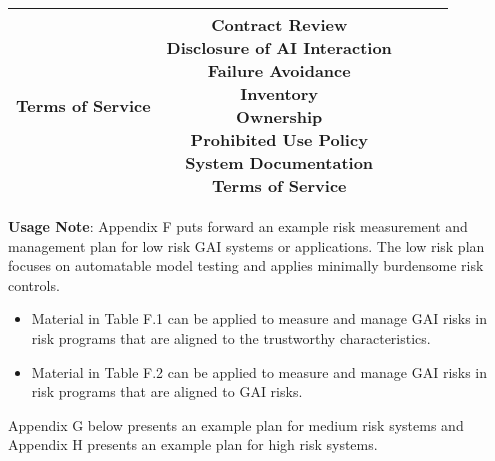 \documentclass[fleqn]{article}
\begin{document}
\begin{landscape}
\begin{table}[H]
\begin{tabular}{|c|c|c|c|c|}
{			\textbullet\hspace{3pt} Terms of Service\\ 	
		} 
		& \makecell[l]{ 	
			\textbullet\hspace{3pt} Contract Review\\ 	
			\textbullet\hspace{3pt} Disclosure of AI Interaction\\ 	
			\textbullet\hspace{3pt} Failure Avoidance\\ 	
			\textbullet\hspace{3pt} Inventory\\ 	
			\textbullet\hspace{3pt} Ownership\\ 	
			\textbullet\hspace{3pt} Prohibited Use Policy\\ 	
			\textbullet\hspace{3pt} System Documentation\\ 	
			\textbullet\hspace{3pt} Terms of Service	\\ 	
		}\\
		\hline
	\end{tabular}
	\label{table:low_risk_plan_by_gai_risk_cont3}
\end{table}

\noindent\textbf{Usage Note}: Appendix F puts forward an example risk measurement and management plan for low risk GAI systems or applications. The low risk plan focuses on automatable model testing and applies minimally burdensome risk controls. 

\begin{itemize}
	\item Material in Table F.1 can be applied to measure and manage GAI risks in risk programs that are aligned to the trustworthy characteristics. 
	\item Material in Table F.2 can be applied to measure and manage GAI risks in risk programs that are aligned to GAI risks. 
\end{itemize}

\noindent Appendix G below presents an example plan for medium risk systems and Appendix H presents an example plan for high risk systems.   

\vfill
\raisebox{-10pt}{\makebox[\linewidth]{\thepage}}

\pagebreak
\thispagestyle{empty}


\end{landscape}
\end{document}
